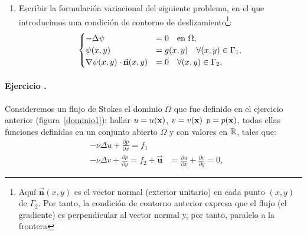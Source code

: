 \documentclass[11pt]{article}
\newcounter{actividad}
\newcommand{\actividad}[1]{
  \stepcounter{actividad}
  \paragraph*{Ejercicio \theactividad. #1}
  }
\newcommand{\Vector}[1]{\ensuremath{\vec{\mathbf{#1}}}}
\renewcommand{\uu}{\Vector{u}}
\renewcommand{\nn}{\Vector{n}}
\renewcommand{\dx}[1]{\frac{\partial #1}{\partial x}}
\renewcommand{\dy}[1]{\frac{\partial #1}{\partial y}}
\begin{document}
\begin{enumerate}
\item Escribir la formulación variacional del siguiente problema, en el que
  introducimos una condición de contorno de deslizamiento\footnote{
    Aquí $\nn(x,y)$ es el vector normal (exterior unitario) en cada
    punto $(x,y)$ de $\Gamma_2$. Por tanto, la condición de contorno
    anterior expresa que el flujo (el gradiente) es perpendicular al
    vector normal y, por tanto, paralelo a la frontera}:
\begin{equation*}
  \begin{cases}
    -\Delta\psi &=0 \quad\text{en } \Omega,
    \\
    \psi(x,y)&=g(x,y) \quad\forall (x,y)\in\Gamma_1,
    \\
    \grad\psi(x,y)\cdot\nn(x,y)&=0 \quad\forall (x,y)\in\Gamma_2,
  \end{cases}
\end{equation*}
\end{enumerate}


\actividad{} Consideremos un flujo de Stokes el dominio $\Omega$ que
fue definido en el ejercicio anterior (figura~\ref{dominio1}):
  hallar $u=u(\mathbf{x})$, $v=v(\mathbf{x})$
    $p=p(\mathbf{x})$, todas ellas funciones definidas en un conjunto
    abierto $\Omega$ y con valores en ${\mathbb R}$, tales que:
    \begin{align}
      &- \nu\Delta u + \dx p = f_1
      \\
      &- \nu\Delta v + \dy p = f_2
      \div{\uu} &= \dx u + \dy v  = 0,
    \end{align}
\end{document}
